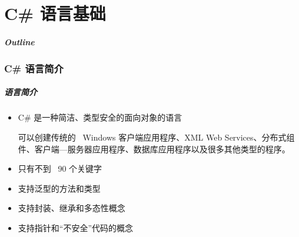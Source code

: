 
\part{C\# 语言基础}

\begin{frame}
\frametitle{Outline}            %
\tableofcontents
\end{frame}

\section{C\# 语言简介}

\begin{frame}
\frametitle{语言简介}

\begin{itemize}
    \setlength{\itemsep}{6pt plus 1pt}
\item C\# 是一种简洁、类型安全的面向对象的语言\par
\smallskip  \CJKindent 可以创建传统的~ Windows 客户端应用程序、XML Web Services、分布式组
  件、客户端---服务器应用程序、数据库应用程序以及很多其他类型的程序。
\item 只有不到~ 90 个关键字
\item 支持泛型的方法和类型
\item 支持封装、继承和多态性概念
\item 支持指针和“不安全”代码的概念
\end{itemize}

\end{frame}



